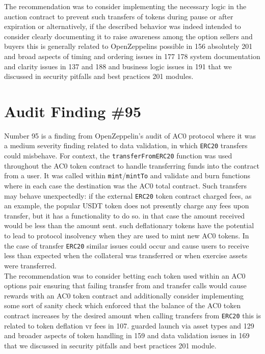 The recommendation was to consider implementing the necessary logic in the auction contract to prevent such transfers of tokens during pause or after expiration or alternatively, if the described behavior was indeed intended to consider clearly documenting it to raise awareness among the option sellers and buyers this is generally related to OpenZeppelins possible in 156 absolutely 201 and broad aspects of timing and ordering issues in 177 178 system documentation and clarity issues in 137 and 188 and business logic issues in 191 that we discussed in security pitfalls and best practices 201 modules.

\section{Audit Finding \#95}

Number 95 is a finding from OpenZeppelin's audit of AC0 protocol where it was a medium severity finding related to data validation, in which \verb|ERC20| transfers could misbehave. For context, the \verb|transferFromERC20| function was used throughout the AC0 token contract to handle transferring funds into the contract from a user. It was called within \verb|mint|/\verb|mintTo| and validate and burn functions where in each case the destination was the AC0 total contract. Such transfers may behave unexpectedly: if the external \verb|ERC20| token contract charged fees, as an example, the popular USDT token does not presently charge any fees upon transfer, but it has a functionality to do so. in that case the amount received would be less than the amount sent. such deflationary tokens have the potential to lead to protocol insolvency when they are used to mint new AC0 tokens. In the case of transfer \verb|ERC20| similar issues could occur and cause users to receive less than expected when the collateral was transferred or when exercise assets were transferred.\\

The recommendation was to consider betting each token used within an AC0 options pair ensuring that failing transfer from and transfer calls would cause rewards with an AC0 token contract and additionally consider implementing some sort of sanity check which enforced that the balance of the AC0 token contract increases by the desired amount when calling transfers from \verb|ERC20| this is related to token deflation vr fees in 107. guarded launch via asset types and 129 and broader aspects of token handling in 159 and data validation issues in 169 that we discussed in security pitfalls and best practices 201 module.

